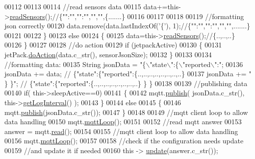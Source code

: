\begin{DoxyCode}
00112         
00113                 
00114         \textcolor{comment}{//read sensors data}
00115         data+=this->\hyperlink{class_cool_board_ad03abdce2e65f520bbf2cff0f2d083cf}{readSensors}();\textcolor{comment}{//\{"":"","":"","","",\{.......\}}
00116 
00117         
00118 
00119         \textcolor{comment}{//formatting json correctly}
00120         data.remove(data.lastIndexOf(\textcolor{charliteral}{'\{'}), 1);\textcolor{comment}{//\{"":"","":"","","",.......\}}
00121                 
00122     \}   
00123     \textcolor{keywordflow}{else}
00124     \{
00125         data=this->\hyperlink{class_cool_board_ad03abdce2e65f520bbf2cff0f2d083cf}{readSensors}();\textcolor{comment}{//\{..,..,..\}}
00126     \}
00127     
00128     \textcolor{comment}{//do action}
00129     \textcolor{keywordflow}{if} (jetpackActive)
00130     \{
00131         jetPack.\hyperlink{class_jetpack_a86d2e83436ef4b85f4c3a6e85ac785b0}{doAction}(data.c\_str(), sensorJsonSize);
00132     \}
00133     
00134     \textcolor{comment}{//formatting data:}
00135     String jsonData = \textcolor{stringliteral}{"\{\(\backslash\)"state\(\backslash\)":\{\(\backslash\)"reported\(\backslash\)":"};
00136     jsonData += data; \textcolor{comment}{// \{"state":\{"reported":\{..,..,..,..,..,..,..,..\}}
00137     jsonData += \textcolor{stringliteral}{" \} \}"}; \textcolor{comment}{// \{"state":\{"reported":\{..,..,..,..,..,..,..,..\}  \} \}}
00138     
00139     \textcolor{comment}{//publishing data   }
00140     \textcolor{keywordflow}{if}( this->sleepActive==0)   
00141     \{
00142         mqtt.\hyperlink{class_cool_m_q_t_t_ace977b3e90ab14b1199fe5c4fb0a13ec}{publish}( jsonData.c\_str(), this->\hyperlink{class_cool_board_aaa24480b273fc095a1356a589c333781}{getLogInterval}() );
00143     \}
00144     \textcolor{keywordflow}{else}
00145     \{
00146         mqtt.\hyperlink{class_cool_m_q_t_t_ace977b3e90ab14b1199fe5c4fb0a13ec}{publish}(jsonData.c\_str());
00147     \}
00148 
00149     \textcolor{comment}{//mqtt client loop to allow data handling}
00150     mqtt.\hyperlink{class_cool_m_q_t_t_aa5eaae967b562b62cbcf2b8d81f6e5d5}{mqttLoop}();
00151 
00152     \textcolor{comment}{//read mqtt answer}
00153     answer = mqtt.\hyperlink{class_cool_m_q_t_t_ae3c18f6ae9723746d32765f1c8f176ca}{read}();
00154     
00155     \textcolor{comment}{//mqtt client loop to allow data handling}
00156     mqtt.\hyperlink{class_cool_m_q_t_t_aa5eaae967b562b62cbcf2b8d81f6e5d5}{mqttLoop}();
00157 
00158     \textcolor{comment}{//check if the configuration needs update }
00159     \textcolor{comment}{//and update it if needed }
00160     \textcolor{keyword}{this} -> \hyperlink{class_cool_board_a8612756d3f73198cdde857a66f0fe690}{update}(answer.c\_str());

\end{DoxyCode}
